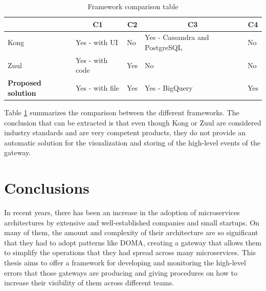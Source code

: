 \documentclass[english, 12pt, a4paper, sci, utf8, a-1b, online]{aaltothesis}
\begin{document}
\begin{table}[h]
\begin{tabular}{|l|l|l|l|l|}
\hline
                  & \multicolumn{1}{c|}{C1} & \multicolumn{1}{c|}{C2} & \multicolumn{1}{c|}{C3}        & \multicolumn{1}{c|}{C4} \\ \hline
\hline
Kong              & Yes - with UI           & No                      & Yes - Cassandra and PostgreSQL & No                      \\ \hline
Zuul              & Yes - with code         & Yes                     & No                             & No                      \\ \hline
\textbf{Proposed solution} & Yes - with file         & Yes                     & Yes - BigQuery                 & Yes                     \\ \hline
\end{tabular}
\caption{Framework comparison table}
\label{tab:frameworks}
\end{table}

Table \ref{tab:frameworks} summarizes the comparison between the different frameworks. The conclusion that can be extracted is that even though Kong or Zuul are considered industry standards and are very competent products, they do not provide an automatic solution for the visualization and storing of the high-level events of the gateway.

\clearpage
\section{Conclusions}
\label{sec:consclussion}




In recent years, there has been an increase in the adoption of microservices architectures by extensive and well-established companies and small startups. On many of them, the amount and complexity of their architecture are so significant that they had to adopt patterns like DOMA, creating a gateway that allows them to simplify the operations that they had spread across many microservices. This thesis aims to offer a framework for developing and monitoring the high-level errors that those gateways are producing and giving procedures on how to increase their visibility of them across different teams.\\
\end{document}
